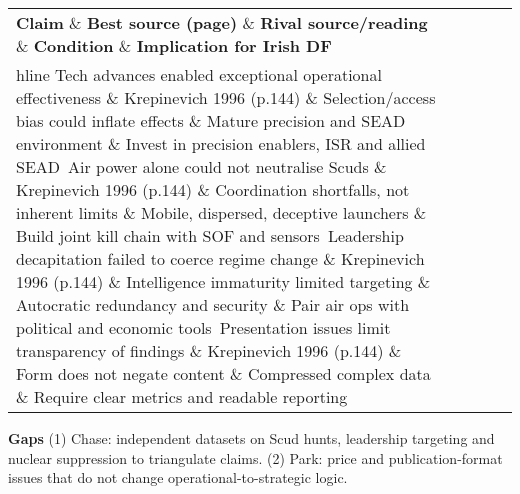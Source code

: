  
\begin{tabular}{p{3.2cm}p{4.2cm}p{3.6cm}p{3.2cm}p{4.2cm}}
	\textbf{Claim} \& \textbf{Best source (page)} \& \textbf{Rival source/reading} \& \textbf{Condition} \& \textbf{Implication for Irish DF}\\hline
	Tech advances enabled exceptional operational effectiveness \& Krepinevich 1996 (p.144) \& Selection/access bias could inflate effects \& Mature precision and SEAD environment \& Invest in precision enablers, ISR and allied SEAD\
	Air power alone could not neutralise Scuds \& Krepinevich 1996 (p.144) \& Coordination shortfalls, not inherent limits \& Mobile, dispersed, deceptive launchers \& Build joint kill chain with SOF and sensors\
	Leadership decapitation failed to coerce regime change \& Krepinevich 1996 (p.144) \& Intelligence immaturity limited targeting \& Autocratic redundancy and security \& Pair air ops with political and economic tools\
	Presentation issues limit transparency of findings \& Krepinevich 1996 (p.144) \& Form does not negate content \& Compressed complex data \& Require clear metrics and readable reporting\
\end{tabular}

\textbf{Gaps}
(1) Chase: independent datasets on Scud hunts, leadership targeting and nuclear suppression to triangulate claims.
(2) Park: price and publication-format issues that do not change operational-to-strategic logic.

\parencite{KREPINEVICH_1992}

